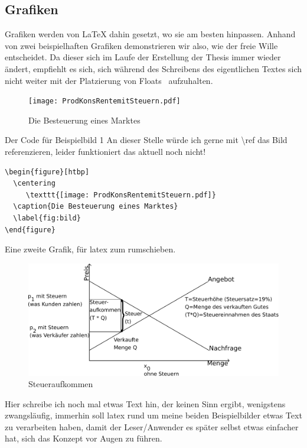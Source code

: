 \subsection{Grafiken}
\label{sec:graphics}
Grafiken werden von LaTeX dahin gesetzt, wo sie am besten hinpassen. Anhand von zwei beispielhaften Grafiken demonstrieren wir also, wie der freie Wille entscheidet. Da dieser sich im Laufe der Erstellung der Thesis immer wieder ändert, empfiehlt es sich, sich während des Schreibens des eigentlichen Textes sich nicht weiter mit der Platzierung von \glqq Floats \grqq\ aufzuhalten.

\begin{figure}[htbp]
  \centering
     \texttt{[image: ProdKonsRentemitSteuern.pdf]}
     \caption{Die Besteuerung eines Marktes}
     \label{fig:bild}
\end{figure}

Der Code für Beispielbild 1%
An dieser Stelle würde ich gerne mit \textbackslash ref das Bild referenzieren, leider funktioniert das aktuell noch nicht!

\begin{lstlisting}
\begin{figure}[htbp]
  \centering
     \texttt{[image: ProdKonsRentemitSteuern.pdf]}
  \caption{Die Besteuerung eines Marktes}
  \label{fig:bild}
\end{figure}
\end{lstlisting}

Eine zweite Grafik, für \gls{latex} zum rumschieben.

\begin{figure}[htbp]
  \centering
     \includegraphics[width=1\linewidth]{PMSteuer.pdf}
  \caption{Steueraufkommen}
  \label{fig:bild2}
\end{figure}

Hier schreibe ich noch mal etwas Text hin, der keinen Sinn ergibt, wenigstens zwangsläufig, immerhin soll \gls{latex} rund um meine beiden Beispielbilder etwas Text zu verarbeiten haben, damit der Leser/Anwender es später selbst etwas einfacher hat, sich das Konzept vor Augen zu führen.

